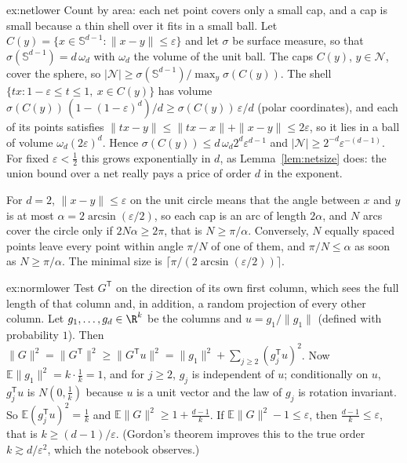 \begin{solution}{ex:netlower}
\idea Count by area: each net point covers only a small cap, and a cap is small because a thin shell over it fits in a small ball.
\writeup Let $C(y)=\{x\in\mathbb S^{d-1}:\|x-y\|\le\varepsilon\}$ and let $\sigma$ be surface measure, so that $\sigma(\mathbb S^{d-1})=d\,\omega_d$ with $\omega_d$ the volume of the unit ball. The caps $C(y)$,
$y\in\mathcal N$, cover the sphere, so $|\mathcal N|\ge\sigma(\mathbb S^{d-1})/\max_y\sigma(C(y))$. The shell $\{tx:1-\varepsilon\le t\le1,\ x\in C(y)\}$ has volume
$\sigma(C(y))\,(1-(1-\varepsilon)^d)/d\ge\sigma(C(y))\,\varepsilon/d$ (polar coordinates), and each of its points satisfies $\|tx-y\|\le\|tx-x\|+\|x-y\|\le2\varepsilon$, so it lies in a ball of volume
$\omega_d(2\varepsilon)^d$. Hence $\sigma(C(y))\le d\,\omega_d2^d\varepsilon^{d-1}$ and $|\mathcal N|\ge2^{-d}\varepsilon^{-(d-1)}$. For fixed $\varepsilon<\frac12$ this grows exponentially in $d$, as
Lemma~\ref{lem:netsize} does: the union bound over a net really pays a price of order $d$ in the exponent.

For $d=2$, $\|x-y\|\le\varepsilon$ on the unit circle means that the angle between $x$ and $y$ is at most $\alpha=2\arcsin(\varepsilon/2)$, so each cap is an arc of length $2\alpha$, and $N$ arcs cover
the circle only if $2N\alpha\ge2\pi$, that is $N\ge\pi/\alpha$. Conversely, $N$ equally spaced points leave every point within angle $\pi/N$ of one of them, and $\pi/N\le\alpha$ as soon as
$N\ge\pi/\alpha$. The minimal size is $\lceil\pi/(2\arcsin(\varepsilon/2))\rceil$.
\end{solution}

\begin{solution}{ex:normlower}
\idea Test $G^{\mathsf T}$ on the direction of its own first column, which sees the full length of that column and, in addition, a random projection of every other column.
\writeup Let $g_1,\dots,g_d\in\R^k$ be the columns and $u=g_1/\|g_1\|$ (defined with probability $1$). Then $\|G\|^2=\|G^{\mathsf T}\|^2\ge\|G^{\mathsf T}u\|^2=\|g_1\|^2+\sum_{j\ge2}(g_j^{\mathsf T}u)^2$.
Now $\mathbb E\|g_1\|^2=k\cdot\frac1k=1$, and for $j\ge2$, $g_j$ is independent of $u$; conditionally on $u$, $g_j^{\mathsf T}u$ is $N(0,\frac1k)$ because $u$ is a unit vector and the law of $g_j$ is
rotation invariant. So $\mathbb E(g_j^{\mathsf T}u)^2=\frac1k$ and $\mathbb E\|G\|^2\ge1+\frac{d-1}k$. If $\mathbb E\|G\|^2-1\le\varepsilon$, then $\frac{d-1}k\le\varepsilon$, that is
$k\ge(d-1)/\varepsilon$. (Gordon's theorem improves this to the true order $k\gtrsim d/\varepsilon^2$, which the notebook observes.)
\end{solution}

